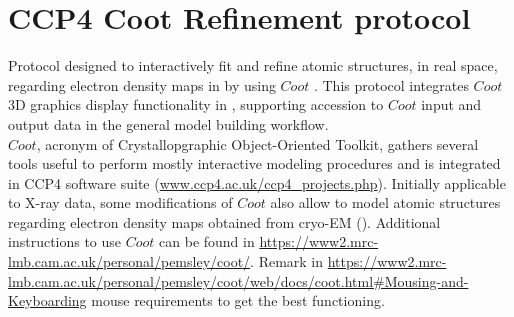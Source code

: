 \section{CCP4 Coot Refinement protocol}
\label{app:ccp4CootRefinement}%
Protocol designed to interactively fit and refine atomic structures, in real space, regarding electron density maps in \scipion by using $Coot$ \citep{emsley2010}. This protocol integrates $Coot$ 3D graphics display functionality in \scipion, supporting accession to $Coot$ input and output data in the general model building workflow.\\$Coot$, acronym of Crystallopgraphic Object-Oriented Toolkit, gathers several tools useful to perform mostly interactive modeling procedures and is integrated in CCP4 software suite (\url{www.ccp4.ac.uk/ccp4\_projects.php}). Initially applicable to X-ray data, some modifications of $Coot$ also allow to model atomic structures regarding electron density maps obtained from cryo-EM (\citep{brown2015}). Additional instructions to use $Coot$ can be found in \url{https://www2.mrc-lmb.cam.ac.uk/personal/pemsley/coot/}. Remark in \url{https://www2.mrc-lmb.cam.ac.uk/personal/pemsley/coot/web/docs/coot.html#Mousing-and-Keyboarding} mouse requirements to get the \coot best functioning.

